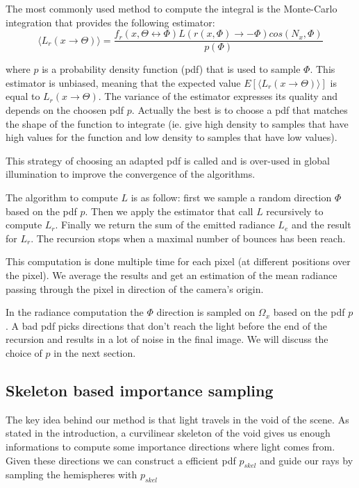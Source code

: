 The most commonly used method to compute the integral is the Monte-Carlo integration that provides the following estimator:
\begin{equation*}
\langle L_r(x \rightarrow \Theta) \rangle = \frac{f_r(x, \Theta \leftrightarrow \Phi) L(r(x, \Phi) \rightarrow -\Phi) cos(N_x, \Phi)}{p(\Phi)}
\end{equation*}

where $p$ is a probability density function (pdf) that is used to sample $\Phi$. This estimator is unbiased, meaning that the expected value $E[\langle L_r(x \rightarrow \Theta) \rangle]$ is equal to $L_r(x \rightarrow \Theta)$. The variance of the estimator expresses its quality and depends on the choosen pdf $p$. Actually the best is to choose a pdf that matches the shape of the function to integrate (ie. give high density to samples that have high values for the function and low density to samples that have low values).

This strategy of choosing an adapted pdf is called  and is over-used in global illumination to improve the convergence of the algorithms.

The algorithm to compute $L$ is as follow: first we sample a random direction $\Phi$ based on the pdf $p$. Then we apply the estimator that call $L$ recursively to compute $L_r$. Finally we return the sum of the emitted radiance $L_e$ and the result for $L_r$. The recursion stops when a maximal number of bounces has been reach.

This computation is done multiple time for each pixel (at different positions over the pixel). We average the results and get an estimation of the mean radiance passing through the pixel in direction of the camera's origin.

In the radiance computation the $\Phi$ direction is sampled on $\Omega_x$ based on the pdf $p$. A bad pdf picks directions that don't reach the light before the end of the recursion and results in a lot of noise in the final image. We will discuss the choice of $p$ in the next section.

\subsection{Skeleton based importance sampling}

The key idea behind our method is that light travels in the void of the scene. As stated in the introduction, a curvilinear skeleton of the void gives us enough informations to compute some importance directions where light comes from. Given these directions we can construct a efficient pdf $p_{skel}$ and guide our rays by sampling the hemispheres with $p_{skel}$

